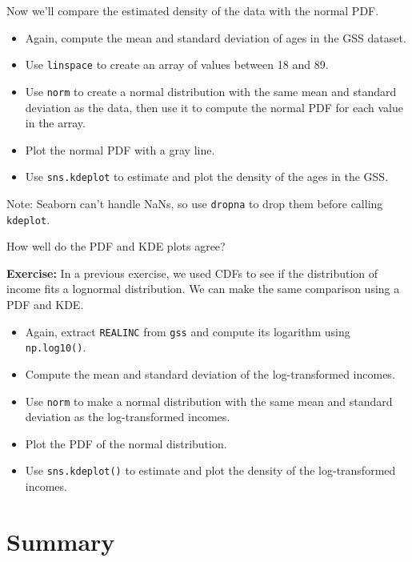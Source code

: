 Now we'll compare the estimated density of the data with the normal PDF.

\begin{itemize}
\item
  Again, compute the mean and standard deviation of ages in the GSS
  dataset.
\item
  Use \passthrough{\lstinline!linspace!} to create an array of values
  between 18 and 89.
\item
  Use \passthrough{\lstinline!norm!} to create a normal distribution
  with the same mean and standard deviation as the data, then use it to
  compute the normal PDF for each value in the array.
\item
  Plot the normal PDF with a gray line.
\item
  Use \passthrough{\lstinline!sns.kdeplot!} to estimate and plot the
  density of the ages in the GSS.
\end{itemize}

Note: Seaborn can't handle NaNs, so use \passthrough{\lstinline!dropna!}
to drop them before calling \passthrough{\lstinline!kdeplot!}.

How well do the PDF and KDE plots agree?

\textbf{Exercise:} In a previous exercise, we used CDFs to see if the
distribution of income fits a lognormal distribution. We can make the
same comparison using a PDF and KDE.

\begin{itemize}
\item
  Again, extract \passthrough{\lstinline!REALINC!} from
  \passthrough{\lstinline!gss!} and compute its logarithm using
  \passthrough{\lstinline!np.log10()!}.
\item
  Compute the mean and standard deviation of the log-transformed
  incomes.
\item
  Use \passthrough{\lstinline!norm!} to make a normal distribution with
  the same mean and standard deviation as the log-transformed incomes.
\item
  Plot the PDF of the normal distribution.
\item
  Use \passthrough{\lstinline!sns.kdeplot()!} to estimate and plot the
  density of the log-transformed incomes.
\end{itemize}

\hypertarget{summary}{%
\section{Summary}\label{summary}}


